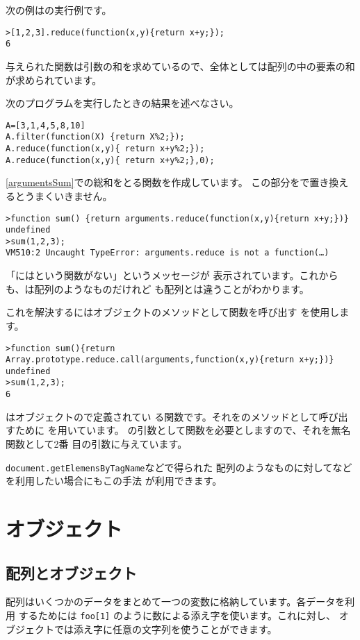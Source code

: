 次の例はの実行例です。
\begin{Verbatim}
>[1,2,3].reduce(function(x,y){return x+y;});
6
\end{Verbatim}
与えられた関数は引数の和を求めているので、全体としては配列の中の要素の和
が求められています。
\begin{Problem}\upshape
 次のプログラムを実行したときの結果を述べなさい。
\begin{Verbatim}
A=[3,1,4,5,8,10]
A.filter(function(X) {return X%2;});
A.reduce(function(x,y){ return x+y%2;});
A.reduce(function(x,y){ return x+y%2;},0);
\end{Verbatim}
\end{Problem}
\ref{argumentsSum}での総和をとる関数を作成しています。
この部分をで置き換えるとうまくいきません。
\begin{Verbatim}
>function sum() {return arguments.reduce(function(x,y){return x+y;})}
undefined
>sum(1,2,3);
VM510:2 Uncaught TypeError: arguments.reduce is not a function(…)
\end{Verbatim}
「にはという関数がない」というメッセージが
表示されています。これからも、は配列のようなものだけれど
も配列とは違うことがわかります。

これを解決するにはオブジェクトのメソッドとして関数を呼び出す
を使用します。
\begin{Verbatim}
>function sum(){return Array.prototype.reduce.call(arguments,function(x,y){return x+y;})}
undefined
>sum(1,2,3);
6
\end{Verbatim}
はオブジェクトので定義されてい
る関数です。それをのメソッドとして呼び出すために
を用いています。
の引数として関数を必要としますので、それを無名関数として2番
目の引数に与えています。

\verb+document.getElemensByTagName+などで得られた
配列のようなものに対してなどを利用したい場合にもこの手法
が利用できます。
 \section{オブジェクト}
\subsection{配列とオブジェクト}
配列はいくつかのデータをまとめて一つの変数に格納しています。各データを利用
するためには \verb+foo[1]+ のように数による添え字を使います。これに対し、
オブジェクトでは添え字に任意の文字列を使うことができます。

